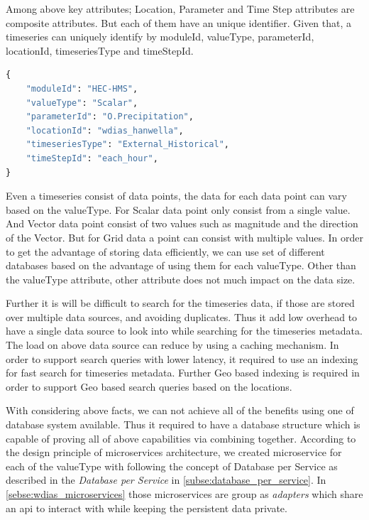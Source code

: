 Among above key attributes; Location, Parameter and Time Step attributes are composite attributes. But each of them have an unique identifier.
Given that, a timeseries can uniquely identify by moduleId, valueType, parameterId, locationId, timeseriesType and timeStepId.
\begin{lstlisting}[language=Python]
{
	"moduleId": "HEC-HMS",
	"valueType": "Scalar",
	"parameterId": "O.Precipitation",
	"locationId": "wdias_hanwella",
	"timeseriesType": "External_Historical",
	"timeStepId": "each_hour",
}
\end{lstlisting}

Even a timeseries consist of data points, the data for each data point can vary based on the valueType. For Scalar data point only consist from a single value. And Vector data point consist of two values such as magnitude and the direction of the Vector. But for Grid data a point can consist with multiple values.
In order to get the advantage of storing data efficiently, we can use set of different databases based on the advantage of using them for each valueType. Other than the valueType attribute, other attribute does not much impact on the data size.

Further it is will be difficult to search for the timeseries data, if those are stored over multiple data sources, and avoiding duplicates. Thus it add low overhead to have a single data source to look into while searching for the timeseries metadata. The load on above data source can reduce by using a caching mechanism. In order to support search queries with lower latency, it required to use an indexing for fast search for timeseries metadata. Further Geo based indexing is required in order to support Geo based search queries based on the locations. 

With considering above facts, we can not achieve all of the benefits using one of database system available. Thus it required to have a database structure which is capable of proving all of above capabilities via combining together. According to the design principle of microservices architecture, we created microservice for each of the valueType with following the concept of Database per Service as described in the \emph{Database per Service} in \cref{subse:database_per_service}. In \cref{sebse:wdias_microservices} those microservices are group as \emph{adapters} which share an \acrshort{api} to interact with while keeping the persistent data private.

